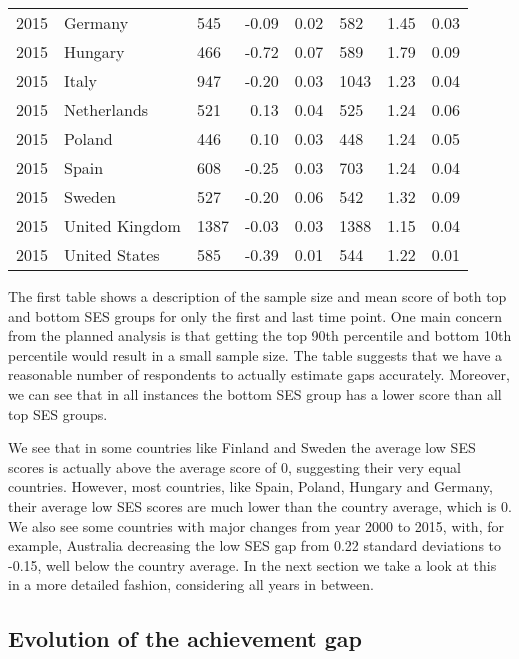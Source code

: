 \documentclass[11pt, a4paper]{article}\usepackage[]{graphicx}\usepackage[]{color}
\begin{document}
{\begin{tabular}{lllrrlrr}
  2015 & Germany & 545 & -0.09 & 0.02 & 582 & 1.45 & 0.03 \\ 
  2015 & Hungary & 466 & -0.72 & 0.07 & 589 & 1.79 & 0.09 \\ 
  2015 & Italy & 947 & -0.20 & 0.03 & 1043 & 1.23 & 0.04 \\ 
  2015 & Netherlands & 521 & 0.13 & 0.04 & 525 & 1.24 & 0.06 \\ 
  2015 & Poland & 446 & 0.10 & 0.03 & 448 & 1.24 & 0.05 \\ 
  2015 & Spain & 608 & -0.25 & 0.03 & 703 & 1.24 & 0.04 \\ 
  2015 & Sweden & 527 & -0.20 & 0.06 & 542 & 1.32 & 0.09 \\ 
  2015 & United Kingdom & 1387 & -0.03 & 0.03 & 1388 & 1.15 & 0.04 \\ 
  2015 & United States & 585 & -0.39 & 0.01 & 544 & 1.22 & 0.01 \\ 
   \hline
\end{tabular}
}


The first table shows a description of the sample size and mean score of both top and bottom SES groups for only the first and last time point. One main concern from the planned analysis is that getting the top 90th percentile and bottom 10th percentile would result in a small sample size. The table suggests that we have a reasonable number of respondents to actually estimate gaps accurately. Moreover, we can see that in all instances the bottom SES group has a lower score than all top SES groups.

We see that in some countries like Finland and Sweden the average low SES scores is actually above the average score of 0, suggesting their very equal countries. However, most countries, like Spain, Poland, Hungary and Germany, their average low SES scores are much lower than the country average, which is 0. We also see some countries with major changes from year 2000 to 2015, with, for example, Australia decreasing the low SES gap from 0.22 standard deviations to -0.15, well below the country average. In the next section we take a look at this in a more detailed fashion, considering all years in between.





\subsection{Evolution of the achievement gap}
\end{document}

